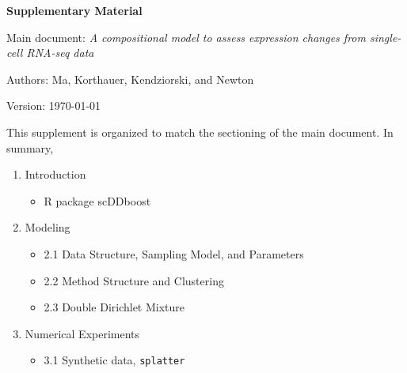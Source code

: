 \documentclass[aoas,preprint]{imsart}
\begin{document}
\large
\centerline{\bf Supplementary Material }

\noindent
Main document: {\em A compositional model to assess expression changes from single-cell RNA-seq data}

\vspace{.2in}
\noindent
Authors: Ma, Korthauer, Kendziorski, and Newton

\vspace{.2in}
\noindent
Version:  \today

\vspace{.4in}

\noindent
This supplement is organized to match the sectioning of the main document.   In summary,

\begin{enumerate}
\item Introduction
   \begin{itemize}
   \item R package scDDboost
   \end{itemize}
\item Modeling
 \begin{itemize}
  \item 2.1 Data Structure, Sampling Model, and Parameters
  \item 2.2 Method Structure and Clustering 
  \item 2.3 Double Dirichlet Mixture
  \end{itemize}
\item Numerical Experiments
   \begin{itemize}
   \item 3.1 Synthetic data, \verb+splatter+

\end{itemize}
\end{enumerate}
\end{document}

